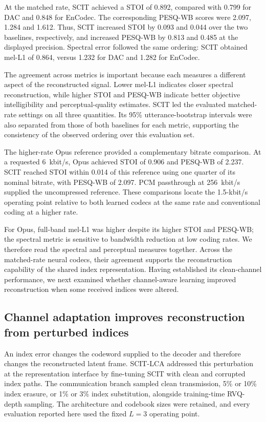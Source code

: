 At the matched rate, SCIT achieved a STOI of 0.892, compared with 0.799 for DAC and 0.848 for EnCodec. The corresponding PESQ-WB scores were 2.097, 1.284 and 1.612. Thus, SCIT increased STOI by 0.093 and 0.044 over the two baselines, respectively, and increased PESQ-WB by 0.813 and 0.485 at the displayed precision. Spectral error followed the same ordering: SCIT obtained mel-L1 of 0.864, versus 1.232 for DAC and 1.282 for EnCodec.



The agreement across metrics is important because each measures a different aspect of the reconstructed signal. Lower mel-L1 indicates closer spectral reconstruction, while higher STOI and PESQ-WB indicate better objective intelligibility and perceptual-quality estimates. SCIT led the evaluated matched-rate settings on all three quantities. Its 95\% utterance-bootstrap intervals were also separated from those of both baselines for each metric, supporting the consistency of the observed ordering over this evaluation set.

The higher-rate Opus reference provided a complementary bitrate comparison. At a requested 6~kbit/s, Opus achieved STOI of 0.906 and PESQ-WB of 2.237. SCIT reached STOI within 0.014 of this reference using one quarter of its nominal bitrate, with PESQ-WB of 2.097. PCM passthrough at 256~kbit/s supplied the uncompressed reference. These comparisons locate the 1.5-kbit/s operating point relative to both learned codecs at the same rate and conventional coding at a higher rate.

For Opus, full-band mel-L1 was higher despite its higher STOI and PESQ-WB; the spectral metric is sensitive to bandwidth reduction at low coding rates. We therefore read the spectral and perceptual measures together. Across the matched-rate neural codecs, their agreement supports the reconstruction capability of the shared index representation. Having established its clean-channel performance, we next examined whether channel-aware learning improved reconstruction when some received indices were altered.

\subsection{Channel adaptation improves reconstruction from perturbed indices}
\label{sec:rv3-robustness}
An index error changes the codeword supplied to the decoder and therefore changes the reconstructed latent frame. SCIT-LCA addressed this perturbation at the representation interface by fine-tuning SCIT with clean and corrupted index paths. The communication branch sampled clean transmission, 5\% or 10\% index erasure, or 1\% or 3\% index substitution, alongside training-time RVQ-depth sampling. The architecture and codebook sizes were retained, and every evaluation reported here used the fixed $L=3$ operating point.

